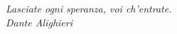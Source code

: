 
\begin{flushright}
    \textit{Lasciate ogni speranza, voi ch'entrate.\\
     Dante Alighieri}
\end{flushright}



